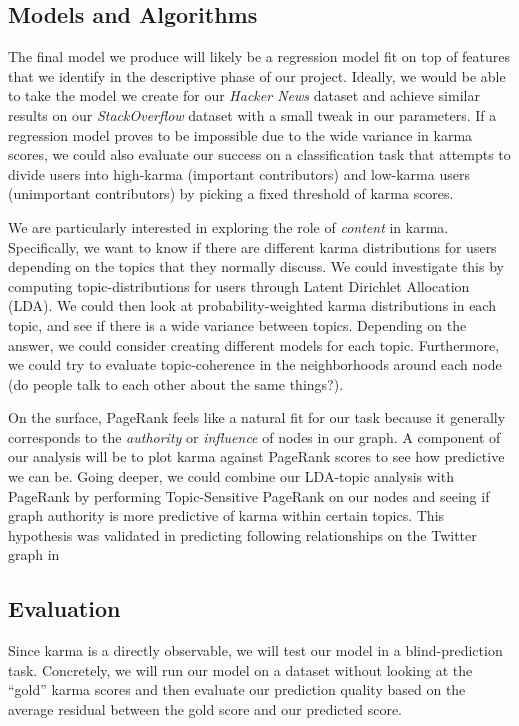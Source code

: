 \documentclass[10pt]{article}
\begin{document}
\subsection{Models and Algorithms}
\label{sec:models}
The final model we produce will likely be a regression model fit on top of
features that we identify in the descriptive phase of our project. Ideally, we
would be able to take the model we create for our \textit{Hacker News} dataset
and achieve similar results on our \textit{StackOverflow} dataset with a small tweak
in our parameters. If a regression model proves to be impossible due to the wide
variance in karma scores, we could also evaluate our success on a classification
task that attempts to divide users into high-karma (important contributors) and
low-karma users (unimportant contributors) by picking a fixed threshold of karma
scores.

We are particularly interested in exploring the role of \textit{content} in
karma. Specifically, we want to know if there are different karma distributions
for users depending on the topics that they normally discuss. We could
investigate this by computing topic-distributions for users through Latent
Dirichlet Allocation (LDA). We could then look at probability-weighted karma
distributions in each topic, and see if there is a wide variance between topics.
Depending on the answer, we could consider creating different models for each
topic. Furthermore, we could try to evaluate topic-coherence in the
neighborhoods around each node (do people talk to each other about the same
things?).

On the surface, PageRank feels like a natural fit for our task because it
generally corresponds to the \textit{authority} or \textit{influence} of nodes
in our graph. A component of our analysis will be to plot karma against PageRank
scores to see how predictive we can be.  Going deeper, we could combine our
LDA-topic analysis with PageRank by performing Topic-Sensitive PageRank
\citep{haveliwala2002topic} on our nodes and seeing if graph authority is more
predictive of karma within certain topics. This hypothesis was validated in
predicting following relationships on the Twitter graph in
\citet{weng2010twitterrank}

\subsection{Evaluation}
Since karma is a directly observable, we will test our model in a
blind-prediction task. Concretely, we will run our model on a dataset without
looking at the ``gold'' karma scores and then evaluate our prediction quality
based on the average residual between the gold score and our predicted score.
\end{document}
